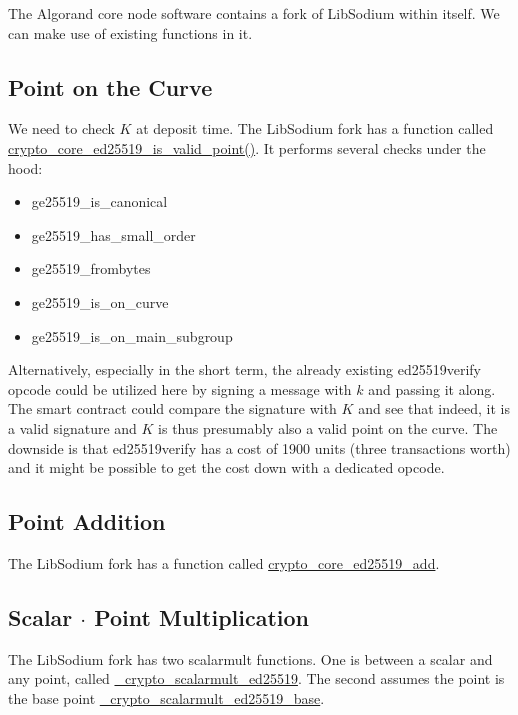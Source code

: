 \documentclass[9pt]{article}
\begin{document}
The Algorand core node software contains a fork of LibSodium within itself. We can make use of existing functions in it.

\subsection{Point on the Curve}

We need to check $K$ at deposit time. The LibSodium fork has a function called \href{https://github.com/algorand/go-algorand/blob/master/crypto/libsodium-fork/src/libsodium/crypto_core/ed25519/core_ed25519.c#L11}{crypto\_core\_ed25519\_is\_valid\_point()}. It performs several checks under the hood:

\begin{itemize}
    \item ge25519\_is\_canonical
    \item ge25519\_has\_small\_order
    \item ge25519\_frombytes
    \item ge25519\_is\_on\_curve
    \item ge25519\_is\_on\_main\_subgroup
\end{itemize}

Alternatively, especially in the short term, the already existing ed25519verify opcode could be utilized here by signing a message with $k$ and passing it along. The smart contract could compare the signature with $K$ and see that indeed, it is a valid signature and $K$ is thus presumably also a valid point on the curve. The downside is that ed25519verify has a cost of 1900 units (three transactions worth) and it might be possible to get the cost down with a dedicated opcode.

\subsection{Point Addition}

The LibSodium fork has a function called \href{https://github.com/algorand/go-algorand/blob/master/crypto/libsodium-fork/src/libsodium/crypto_core/ed25519/core_ed25519.c#L26}{crypto\_core\_ed25519\_add}.

\subsection{Scalar $\cdot$ Point Multiplication}

The LibSodium fork has two scalarmult functions. One is between a scalar and any point, called \href{https://github.com/algorand/go-algorand/blob/master/crypto/libsodium-fork/src/libsodium/crypto_scalarmult/ed25519/ref10/scalarmult_ed25519_ref10.c#L31}{\_crypto\_scalarmult\_ed25519}. The second assumes the point is the base point \href{https://github.com/algorand/go-algorand/blob/f06c4816d0e7c5ec1a67744373268719d012e628/crypto/libsodium-fork/src/libsodium/crypto_scalarmult/ed25519/ref10/scalarmult_ed25519_ref10.c#L74}{\_crypto\_scalarmult\_ed25519\_base}.
\end{document}
